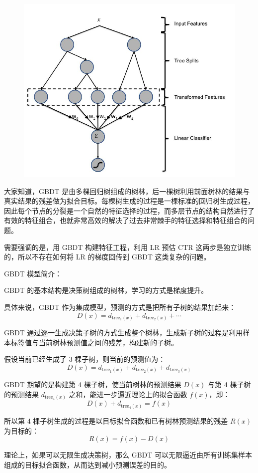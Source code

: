 \documentclass[12pt]{article}
\begin{document}
\begin{figure}[H]
    \centering
    \includegraphics[width=.6\textwidth]{fig/Facebook_GBDT_LR_Feature.jpg}
\end{figure}

大家知道，GBDT 是由多棵回归树组成的树林，后一棵树利用前面树林的结果与真实结果的残差做为拟合目标。每棵树生成的过程是一棵标准的回归树生成过程，因此每个节点的分裂是一个自然的特征选择的过程，而多层节点的结构自然进行了有效的特征组合，也就非常高效的解决了过去非常棘手的特征选择和特征组合的问题。

需要强调的是，用 GBDT 构建特征工程，利用 LR 预估 CTR 这两步是独立训练的，所以不存在如何将 LR 的梯度回传到 GBDT 这类复杂的问题。

\begin{framed}
GBDT 模型简介：

GBDT 的基本结构是决策树组成的树林，学习的方式是梯度提升。

具体来说，GBDT 作为集成模型，预测的方式是把所有子树的结果加起来：
$$
D(x) = d_{\text{tree}_1(x)} + d_{\text{tree}_2(x)} + \cdots
$$

GBDT 通过逐一生成决策子树的方式生成整个树林，生成新子树的过程是利用样本标签值与当前树林预测值之间的残差，构建新的子树。

假设当前已经生成了 3 棵子树，则当前的预测值为：
$$
D(x) = d_{\text{tree}_1(x)} + d_{\text{tree}_2(x)} + d_{\text{tree}_3(x)}
$$

GBDT 期望的是构建第 4 棵子树，使当前树林的预测结果 $D(x)$ 与第 4 棵子树的预测结果 $d_{\text{tree}_4(x)}$ 之和，能进一步逼近理论上的拟合函数 $f(x)$，即：
$$
D(x) + d_{\text{tree}_4(x)} = f(x)
$$

所以第 4 棵子树生成的过程是以目标拟合函数和已有树林预测结果的残差 $R(x)$ 为目标的：
$$
R(x) = f(x) - D(x)
$$

理论上，如果可以无限生成决策树，那么 GBDT 可以无限逼近由所有训练集样本组成的目标拟合函数，从而达到减小预测误差的目的。
\end{framed}
\end{document}
